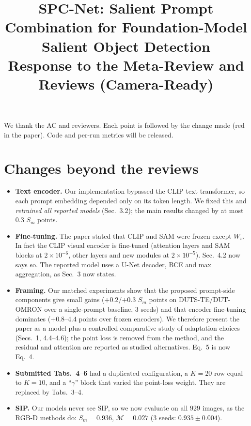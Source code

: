 \documentclass[10pt,twocolumn,letterpaper]{article}
\begin{document}
\title{SPC-Net: Salient Prompt Combination for Foundation-Model Salient Object Detection\\
\large Response to the Meta-Review and Reviews (Camera-Ready)}

\maketitle
\thispagestyle{empty}
\appendix

We thank the AC and reviewers. Each point is followed by the change made (red in
the paper). Code and per-run metrics will be released.

\section{Changes beyond the reviews}
\begin{itemize}\itemsep0pt
\item \textbf{Text encoder.} Our implementation bypassed the CLIP text transformer,
  so each prompt embedding depended only on its token length. We fixed this and
  \emph{retrained all reported models} (Sec.~3.2); the main results changed by at
  most $0.3$ $S_m$ points.
\item \textbf{Fine-tuning.} The paper stated that CLIP and SAM were frozen except
  $W_v$. In fact the CLIP visual encoder is fine-tuned (attention layers and SAM
  blocks at $2{\times}10^{-6}$, other layers and new modules at $2{\times}10^{-5}$).
  Sec.~4.2 now says so. The reported model uses a U-Net decoder, BCE and max
  aggregation, as Sec.~3 now states.
\item \textbf{Framing.} Our matched experiments show that the proposed prompt-side
  components give small gains ($+0.2$/$+0.3$ $S_m$ points on DUTS-TE/DUT-OMRON over a
  single-prompt baseline, 3 seeds) and that encoder fine-tuning dominates
  ($+0.8$--$4.4$ points over frozen encoders). We therefore present the paper as a
  model plus a controlled comparative study of adaptation choices (Secs.~1, 4.4--4.6);
  the point loss is removed from the method, and the residual and attention are
  reported as studied alternatives. Eq.~5 is now Eq.~4.
\item \textbf{Submitted Tabs.~4--6} had a duplicated configuration, a $K{=}20$ row
  equal to $K{=}10$, and a ``$\gamma$'' block that varied the point-loss weight. They
  are replaced by Tabs.~3--4.
\item \textbf{SIP.} Our models never see SIP, so we now evaluate on all 929 images,
  as the RGB-D methods do: $S_m{=}0.936$, $\mathcal{M}{=}0.027$
  (3 seeds: $0.935{\pm}0.004$).
\end{itemize}
\end{document}
